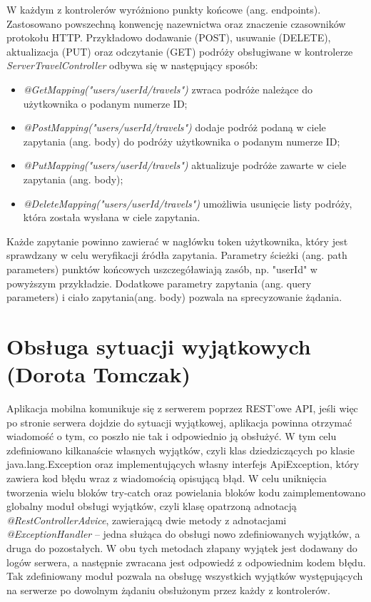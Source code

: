 \documentclass[10pt,twoside,a4paper]{report}
\begin{document}
\par W każdym z kontrolerów wyróżniono punkty końcowe (ang. endpoints). Zastosowano powszechną konwencję nazewnictwa oraz znaczenie czasowników protokołu HTTP. Przykładowo dodawanie (POST), usuwanie (DELETE), aktualizacja (PUT) oraz odczytanie (GET) podróży obsługiwane w kontrolerze \textit{ServerTravelController} odbywa się w następujący sposób:
\begin{itemize}
\item \textit{@GetMapping("users/{userId}/travels")} zwraca podróże należące do użytkownika o podanym numerze ID;
\item \textit{@PostMapping("users/{userId}/travels")} dodaje podróż podaną w ciele zapytania (ang. body) do podróży użytkownika o podanym numerze ID;
\item \textit{@PutMapping("users/{userId}/travels")} aktualizuje podróże zawarte w ciele zapytania (ang. body);
\item \textit{@DeleteMapping("users/{userId}/travels")} umożliwia usunięcie listy podróży, która została wysłana w ciele zapytania.
\end{itemize}

\par Każde zapytanie powinno zawierać w nagłówku token użytkownika, który jest sprawdzany w celu weryfikacji źródła zapytania. Parametry ścieżki (ang. path parameters) punktów końcowych uszczegóławiają zasób, np. "userId" w powyższym przykładzie. Dodatkowe parametry zapytania (ang. query parameters) i ciało zapytania(ang. body) pozwala na sprecyzowanie żądania.

\section{Obsługa sytuacji wyjątkowych (Dorota Tomczak)}
\par Aplikacja mobilna komunikuje się z serwerem poprzez REST'owe API, jeśli więc po stronie serwera dojdzie do sytuacji wyjątkowej, aplikacja powinna otrzymać wiadomość o tym, co poszło nie tak i odpowiednio ją obsłużyć. W tym celu zdefiniowano kilkanaście własnych wyjątków, czyli klas dziedziczących po klasie java.lang.Exception oraz implementujących własny interfejs ApiException, który zawiera kod błędu wraz z wiadomością opisującą błąd. W celu uniknięcia tworzenia wielu bloków try-catch oraz powielania bloków kodu zaimplementowano globalny moduł obsługi wyjątków, czyli klasę opatrzoną adnotacją \textit{@RestControllerAdvice}, zawierającą dwie metody z adnotacjami \textit{@ExceptionHandler} – jedna służąca do obsługi nowo zdefiniowanych wyjątków, a druga do pozostałych. W obu tych metodach złapany wyjątek jest dodawany do logów serwera, a następnie zwracana jest odpowiedź z odpowiednim kodem błędu. Tak zdefiniowany moduł pozwala na obsługę wszystkich wyjątków występujących na serwerze po dowolnym żądaniu obsłużonym przez każdy z kontrolerów.
\end{document}
